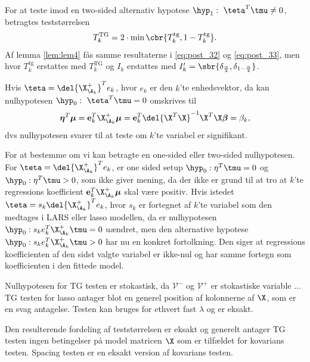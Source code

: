For at teste imod en two-sided alternativ hypotese \(\hyp_1: \ \teta^T \tmu \neq 0\), betragtes teststørrelsen
\begin{align*}
T_k^\text{TG}= 2 \cdot \min \cbr{T_k^{\text{tg}}, 1-T_k^{\text{tg}}}.
\end{align*}
Af lemma \ref{lem:lem4} fås samme resultaterne i \eqref{eq:post_32} og \eqref{eq:post_33}, men hvor \(T_k^\text{tg}\) erstattes med \(T_k^\text{TG}\) og \(I_k\) erstattes med \(I_k'= \sbr{\delta_{\frac{\alpha}{2}}, \delta_{1-\frac{\alpha}{2}}}\).

Hvis \(\teta = \del{\X_{\A_k}^+}^T e_k\), hvor \(e_k\) er den \(k\)'te enhedsvektor, da kan nulhypotesen \(\hyp_0: \ \teta^T \tmu =0\) omskrives til
\begin{align*}
\boldsymbol{\eta}^T \boldsymbol{\mu} = \mathbf{e}_k^T \X_{\A_k}^+ \boldsymbol{\mu} = \mathbf{e}_k^T \del{\X^T \X}^{-1} \X^T \X \boldsymbol{\beta} = \beta_k,
\end{align*}
dvs nulhypotesen svarer til at teste om \(k\)'te variabel er signifikant.

For at bestemme om vi kan betragte en one-sided eller two-sided nulhypotesen.
For \(\teta = \del{\X_{\A_k}^+}^T e_k\), er one sided setup \(\hyp_0: \eta^T \tmu = 0\) og  \(\hyp_0: \eta^T \tmu > 0\), som ikke giver mening, da der ikke er grund til at tro at \(k\)'te regressions koefficient \(\mathbf{e}_k^T \X_{\A_k}^+ \boldsymbol{\mu}\) skal være positiv.
Hvis istedet \(\teta = s_k \del{\X_{\A_k}^+}^T e_k\), hvor \(s_k\) er fortegnet af \(k\)'te variabel som den medtages i LARS eller lasso modellen, da er nulhypotesen \(\hyp_0: s_k e_k^T \X_{\A_k}^+ \tmu = 0\) uændret, men den alternative hypotese \(\hyp_0: s_k e_k^T \X_{\A_k}^+ \tmu > 0\) har nu en konkret fortolkning.
Den siger at regressions koefficienten af den sidst valgte variabel er ikke-nul og har samme fortegn som koefficienten i den fittede model.


Nulhypotesen for TG testen er stokastisk, da \(\mathcal{V}^-\) og \(\mathcal{V}^+\) er stokastiske variable ...
TG testen for lasso antager blot en generel position af kolonnerne af \(\X\), som er en svag antagelse.
Testen kan bruges for ethvert fast \(\lambda\) og er eksakt.

Den resulterende fordeling af teststørrelsen er eksakt og generelt antager TG testen ingen betingelser på model matricen \(\X\) som er tilfældet for kovarians testen.
Spacing testen er en eksakt version af kovarians testen. 